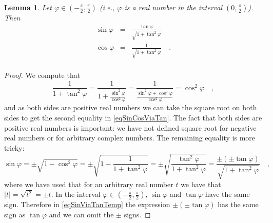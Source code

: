 \documentclass[12pt]{book}
\newtheorem{lemma}[theorem]{Lemma}
\begin{document}
\begin{lemma}
Let $\varphi\in (-\frac{\pi}{2} ,\frac{\pi}{2})$ (i.e., $\varphi$ is a real number in the interval $(0,\frac{\pi}{2})$). Then
\begin{equation}\label{eqSinCosViaTan}
\begin{array}{rcl}
\sin \varphi &=& \frac{ \tan \varphi}{\sqrt  {1+\tan^2 \varphi  }}\\
\cos \varphi &=& \frac{1}{\sqrt  {1+\tan^2 \varphi  }}\quad .\\
\end{array}
\end{equation}
\end{lemma}
\begin{proof}
We compute that
\[\frac{1}{1+\tan^2 \varphi} = \frac{1}{1+\frac{\sin^2 \varphi}{\cos^2\varphi}}= \frac{1}{\frac{\sin^2\varphi+\cos^2\varphi}{\cos^2\varphi}}= \cos^2{\varphi}\quad ,
\]
and as both sides are positive real numbers we can take the square root on both sides to get the second equality in \eqref{eqSinCosViaTan}. The fact that both sides are positive real numbers is important: we have not defined square root for negative real numbers or for arbitrary complex numbers. The remaining equality is more tricky:
\begin{equation}\label{eqSinViaTanTemp}
\sin \varphi = \pm \sqrt{1-\cos^2\varphi}= \pm \sqrt{1-\frac{1}{1+\tan^2\varphi}}= \pm \sqrt{\frac{\tan^2\varphi}{1+\tan^2\varphi}}=
\frac{\pm (\pm \tan\varphi)}{\sqrt{1+\tan^2\varphi}}\quad ,
\end{equation}
where we have used that for an arbitrary real number $t$ we have that $|t|=\sqrt{t^2}=\pm t$. In the interval $\varphi\in (-\frac{\pi}{2} ,\frac{\pi}{2})$, $\sin \varphi$ and $\tan \varphi$ have the same sign. Therefore in \eqref{eqSinViaTanTemp} the expression $\pm(\pm \tan\varphi)$ has the same sign as $\tan \varphi$ and we can omit the $\pm$ signs.
\end{proof}
\end{document}
